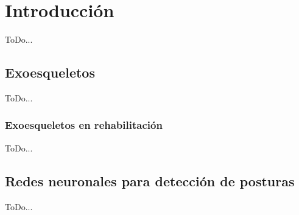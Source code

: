 \chapter{Introducción}
\label{cap:capitulo1}
\setcounter{page}{1}

ToDo...

\section{Exoesqueletos}
\label{sec:exoesqueletos}

ToDo...

\subsection{Exoesqueletos en rehabilitación}
\label{subsec:exoesqueletos_rehabilitacion}

ToDo...

\section{Redes neuronales para detección de posturas}
\label{subsec:redes_neuronales_deteccion_posturas}

ToDo...